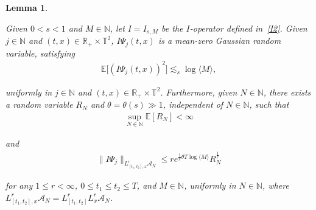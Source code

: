\documentclass[letterpaper, 11pt,  reqno]{amsart}
\newtheorem{lemma}[theorem]{Lemma}
\newcommand{\1}{\hspace{0.5mm}\text{I}\hspace{0.2mm}}
\newcommand{\noi}{\noindent}
\newcommand{\R}{\mathbb{R}}
\newcommand{\T}{\mathbb{T}}
\newcommand{\N}{\mathbb{N}}
\newcommand{\E}{\mathbb{E}}
\newcommand{\ta}{\theta}
\newcommand{\les}{\lesssim}
\newcommand{\A}{\mathcal{A}}
\newcommand{\jb}[1]{\langle #1 \rangle}
\numberwithin{equation}{section}
\numberwithin{theorem}{section}
\begin{document}
\begin{lemma} 
\label{LEM:sto2}


Given $0 < s < 1$ and $M \in \N$, let $I = I_{s, M}$
be the $I$-operator defined in~\eqref{I2}.
Given $j \in \N$ and  
$(t, x) \in \R_+\times \T^2$, 
 $I \Psi_j (t, x)$ is a mean-zero Gaussian random variable, 
 satisfying
\begin{align}
 \E\big[  (I\Psi_j (t, x))^2 \big]
\les _s  \log \jb{M}, 
\label{mom3a}
\end{align}

\noi
uniformly in 
$j \in \N$ and 
$(t, x) \in \R_+\times \T^2$.
Furthermore, given $N \in \N$, there exists
a random variable $R_N$
and  $\ta = \ta(s) \gg 1$, independent of $N \in \N$, 
such that 
\begin{align}
\sup_{N \in \N} \E[ R_N ]  < \infty
\label{mom4}
\end{align}


\noi
and 
\begin{align}
\| I \Psi_j  \|_{L^r_{[t_1, t_2], x}\A_N} 
 \le
r e^{\frac 1r \ta T \log \jb{M}} R_N^\frac 1r
\label{mom4a} 
\end{align}

\noi
for any 
$1 \le r < \infty$, 
$0 \le t_1  \le t_2 \le T$, 
and $M \in \N$, 
uniformly in $N \in \N$, 
where
$L^r_{[t_1, t_2], x}\A_N
= L^r_{[t_1, t_2]}L^r_x \A_N$.

\end{lemma}
\end{document}
